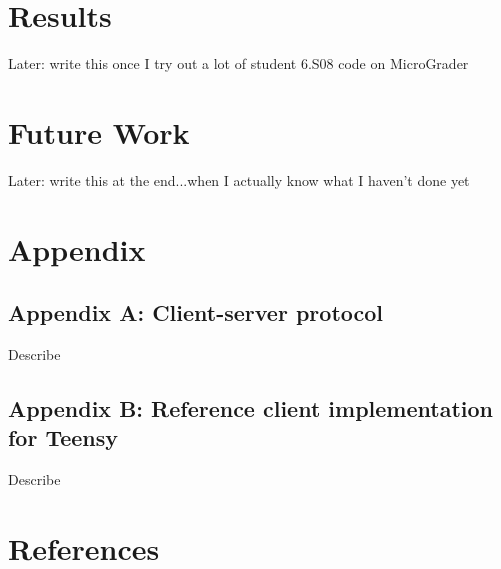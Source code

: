 \documentclass[12pt]{article}
\begin{document}
\newpage
\section{Results}
Later: write this once I try out a lot of student 6.S08 code on MicroGrader

\newpage
\section{Future Work}
Later: write this at the end...when I actually know what I haven't done yet 

\newpage
\section{Appendix}

\subsection{Appendix A: Client-server protocol}
\label{sec:protocol}
Describe

\subsection{Appendix B: Reference client implementation for Teensy}
\label{sec:teensy}
Describe

\newpage
\section{References}
\end{document}
